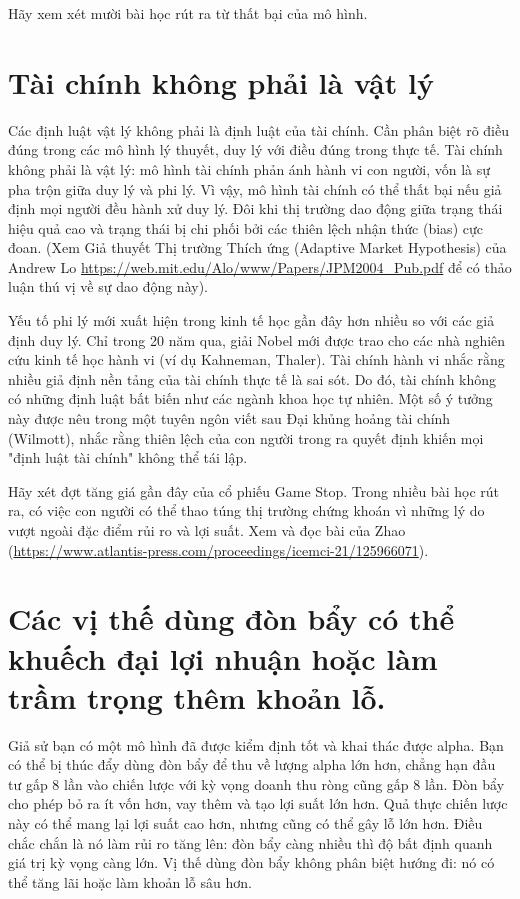Hãy xem xét mười bài học rút ra từ thất bại của mô hình.

\section{Tài chính không phải là vật lý}

Các định luật vật lý không phải là định luật của tài chính. Cần phân biệt rõ điều đúng trong các mô hình lý thuyết, duy lý với điều đúng trong thực tế. Tài chính không phải là vật lý: mô hình tài chính phản ánh hành vi con người, vốn là sự pha trộn giữa duy lý và phi lý. Vì vậy, mô hình tài chính có thể thất bại nếu giả định mọi người đều hành xử duy lý. Đôi khi thị trường dao động giữa trạng thái hiệu quả cao và trạng thái bị chi phối bởi các thiên lệch nhận thức (bias) cực đoan. (Xem Giả thuyết Thị trường Thích ứng (Adaptive Market Hypothesis) của Andrew Lo \url{https://web.mit.edu/Alo/www/Papers/JPM2004_Pub.pdf} để có thảo luận thú vị về sự dao động này).

Yếu tố phi lý mới xuất hiện trong kinh tế học gần đây hơn nhiều so với các giả định duy lý. Chỉ trong 20 năm qua, giải Nobel mới được trao cho các nhà nghiên cứu kinh tế học hành vi (ví dụ Kahneman, Thaler). Tài chính hành vi nhắc rằng nhiều giả định nền tảng của tài chính thực tế là sai sót. Do đó, tài chính không có những định luật bất biến như các ngành khoa học tự nhiên. Một số ý tưởng này được nêu trong một tuyên ngôn viết sau Đại khủng hoảng tài chính (Wilmott), nhắc rằng thiên lệch của con người trong ra quyết định khiến mọi "định luật tài chính" không thể tái lập.

Hãy xét đợt tăng giá gần đây của cổ phiếu Game Stop. Trong nhiều bài học rút ra, có việc con người có thể thao túng thị trường chứng khoán vì những lý do vượt ngoài đặc điểm rủi ro và lợi suất. Xem và đọc bài của Zhao (\url{https://www.atlantis-press.com/proceedings/icemci-21/125966071}).

\section{Các vị thế dùng đòn bẩy có thể khuếch đại lợi nhuận hoặc làm trầm trọng thêm khoản lỗ.}

Giả sử bạn có một mô hình đã được kiểm định tốt và khai thác được alpha. Bạn có thể bị thúc đẩy dùng đòn bẩy để thu về lượng alpha lớn hơn, chẳng hạn đầu tư gấp 8 lần vào chiến lược với kỳ vọng doanh thu ròng cũng gấp 8 lần. Đòn bẩy cho phép bỏ ra ít vốn hơn, vay thêm và tạo lợi suất lớn hơn. Quả thực chiến lược này có thể mang lại lợi suất cao hơn, nhưng cũng có thể gây lỗ lớn hơn. Điều chắc chắn là nó làm rủi ro tăng lên: đòn bẩy càng nhiều thì độ bất định quanh giá trị kỳ vọng càng lớn. Vị thế dùng đòn bẩy không phân biệt hướng đi: nó có thể tăng lãi hoặc làm khoản lỗ sâu hơn.

